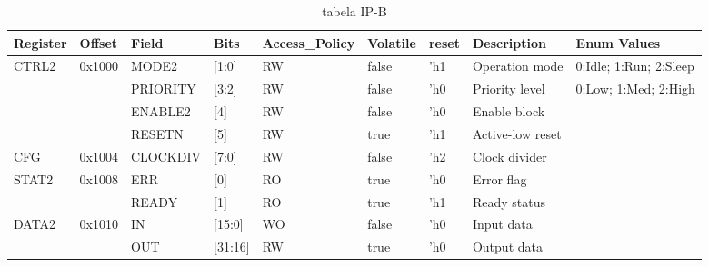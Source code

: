 \documentclass{article}
\begin{document}
\begin{table}[h]
\centering
\caption{tabela IP-B}
\label{table:IP-B}
\fontsize{7}{10}\selectfont
\begin{tabular}{|l|l|l|l|l|l|l|l|l|}
\hline
\textbf{Register} & \textbf{Offset} & \textbf{Field} & \textbf{Bits} & \textbf{Access\_Policy} & \textbf{Volatile} & \textbf{reset} & \textbf{Description} & \textbf{Enum Values} \\ \hline
\multirow{4}{*}{CTRL2} & \multirow{4}{*}{0x1000} & MODE2     & [1:0]  & RW  & false & 'h1  & Operation mode      & 0:Idle; 1:Run; 2:Sleep \\ \cline{3-9}
        &        & PRIORITY  & [3:2]  & RW  & false & 'h0  & Priority level      & 0:Low; 1:Med; 2:High    \\ \cline{3-9}
        &        & ENABLE2   & [4]    & RW  & false & 'h0  & Enable block        &                         \\ \cline{3-9}
        &        & RESETN    & [5]    & RW  & true  & 'h1  & Active-low reset    &                         \\ \hline
CFG     & 0x1004 & CLOCKDIV  & [7:0]  & RW  & false & 'h2  & Clock divider       &                         \\ \hline
\multirow{2}{*}{STAT2} & \multirow{2}{*}{0x1008} & ERR       & [0]    & RO  & true  & 'h0  & Error flag          &                         \\ \cline{3-9}
        &        & READY     & [1]    & RO  & true  & 'h1  & Ready status        &                         \\ \hline
\multirow{2}{*}{DATA2} & \multirow{2}{*}{0x1010} & IN      & [15:0] & WO  & false & 'h0  & Input data          &                         \\ \cline{3-9}
        &        & OUT       & [31:16]& RW  & true  & 'h0  & Output data         &                         \\ \hline
\end{tabular}
\end{table}
\end{document}
